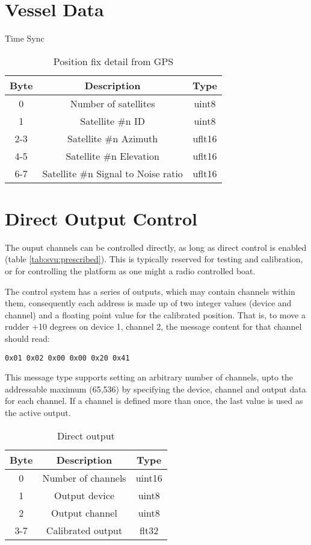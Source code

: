 \section{Vessel Data}
\label{msg006}
Time Sync
\begin{table}[H]
  \centering
  \begin{tabular}{ c c c }
  Byte & Description & Type \\
\hline
    0  & Number of satellites               & uint8  \\
    1  & Satellite \#n ID                   & uint8  \\
   2-3 & Satellite \#n Azimuth               & uflt16 \\
   4-5 & Satellite \#n Elevation             & uflt16 \\
   6-7 & Satellite \#n Signal to Noise ratio & uflt16 \\
  \end{tabular}
  \caption{Position fix detail from GPS}
\end{table}

\section{Direct Output Control}
\label{msg007}
The ouput channels can be controlled directly, as long as direct control is enabled (table \ref{tab:svu:prescribed}). This is typically reserved for testing and calibration, or for controlling the platform as one might a radio controlled boat.

The control system has a series of outputs, which may contain channels within them, consequently each address is made up of two integer values (device and channel) and a floating point value for the calibrated position. That is, to move a rudder +10 degrees on device 1, channel 2, the message content for that channel should read:
\begin{verbatim}
0x01 0x02 0x00 0x00 0x20 0x41
\end{verbatim} 

This message type supports setting an arbitrary number of channels, upto the addressable maximum (65,536) by specifying the device, channel and output data for each channel. If a channel is defined more than once, the last value is used as the active output.

\begin{table}[H]
  \centering
  \begin{tabular}{ c c c }
  Byte & Description & Type \\
\hline
    0  & Number of channels & uint16 \\
    1  & Output device      & uint8 \\
    2  & Output channel     & uint8 \\
  3-7  & Calibrated output  & flt32 \\
  \end{tabular}
  \caption{Direct output}
\end{table}

